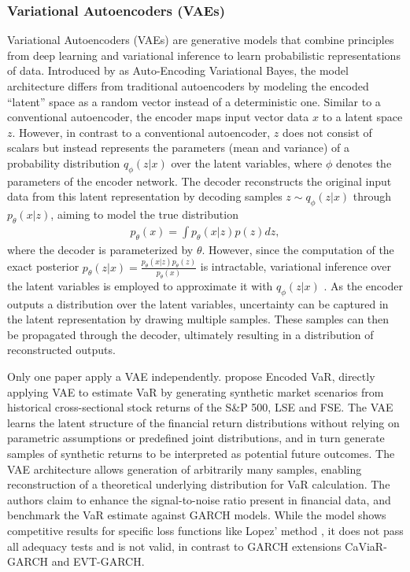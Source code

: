 

\subsubsection{Variational Autoencoders (VAEs)}
Variational Autoencoders (VAEs) are generative models that combine principles from deep learning and variational inference to learn probabilistic representations of data. Introduced by \textcite{kingma2013auto} as Auto-Encoding Variational Bayes, the model architecture differs from traditional autoencoders by modeling the encoded “latent” space as a random vector instead of a deterministic one.
Similar to a conventional autoencoder, the encoder maps input vector data $x$ to a latent space $z$. However, in contrast to a conventional autoencoder, $z$ does not consist of scalars but instead represents the parameters (mean and variance) of a probability distribution $q_\phi(z|x)$ over the latent variables, where $\phi$ denotes the parameters of the encoder network. The decoder reconstructs the original input data from this latent representation by decoding samples $z \sim q_\phi(z|x)$ through $p_\theta(x|z)$, aiming to model the true distribution
\begin{equation}
    \begin{gathered}
        p_\theta(x) = \int p_\theta(x|z)p(z)dz,
    \end{gathered}
\end{equation}
where the decoder is parameterized by $\theta$. However, since the computation of the exact posterior $p_{\theta}(z|x) = \frac{p_{\theta}(x|z) p_{\theta}(z)}{p_{\theta}(x)}$ is intractable, variational inference over the latent variables is employed to approximate it with $q_\phi(z|x)$ \parencite{kingma2013auto}. As the encoder outputs a distribution over the latent variables, uncertainty can be captured in the latent representation by drawing multiple samples. These samples can then be propagated through the decoder, ultimately resulting in a distribution of reconstructed outputs.


Only one paper apply a VAE independently. \textcite{arian2022encoded} propose Encoded VaR, directly applying VAE to estimate VaR by generating synthetic market scenarios from historical cross-sectional stock returns of the S\&P 500, LSE and FSE. The VAE learns the latent structure of the financial return distributions without relying on parametric assumptions or predefined joint distributions, and in turn generate samples of synthetic returns to be interpreted as potential future outcomes. The VAE architecture allows generation of arbitrarily many samples, enabling reconstruction of a theoretical underlying distribution for VaR calculation. The authors claim to enhance the signal-to-noise ratio present in financial data, and benchmark the VaR estimate against GARCH models. While the model shows competitive results for specific loss functions like Lopez' method \parencite{lopez1998methods}, it does not pass all adequacy tests and is not valid, in contrast to GARCH extensions CaViaR-GARCH and EVT-GARCH. 

